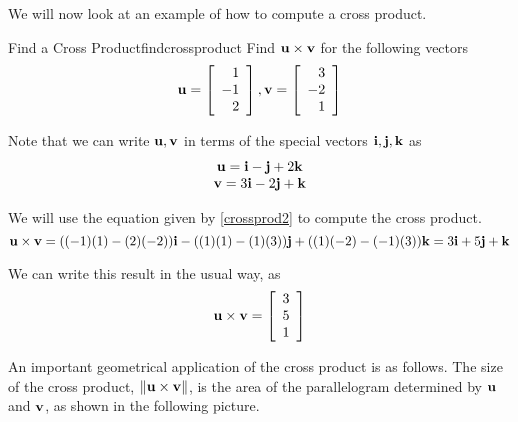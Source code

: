 We will now look at an example of how to compute a cross product.

\begin{example}{Find a Cross Product}{findcrossproduct}
Find ${\bf u} \times {\bf v}$ for the following vectors
\begin{equation*}
{\bf u}
=
\left[
\begin{array}{r}
1 \\
-1 \\
2
\end{array}
\right],
{\bf v}
=
\left[
\begin{array}{r}
3 \\
-2 \\
1
\end{array}
\right]
\end{equation*}
\end{example}

\begin{solution}
Note that we can write ${\bf u}, {\bf v}$ in terms of the special vectors ${\bf i},
{\bf j}, {\bf k}$ as 
\begin{equation*}
\begin{array}{c}
{\bf u}
=
{\bf i}-{\bf j}+2{\bf k} \\
{\bf v}
=
 3{\bf i}-2{\bf j}+{\bf k}
\end{array}
\end{equation*}

We will use the equation given by \ref{crossprod2} to compute the cross product. 
\begin{equation*}
{\bf u} \times {\bf v}
=((-1)(1)-(2)(-2)) {\bf i}- ((1)(1)-(1)(3)) {\bf j}+((1)(-2)-(-1)(3)) {\bf k}=3{\bf i}+5{\bf j}+{\bf k}
\end{equation*}

We can write this result in the usual way, as
\begin{equation*}
{\bf u} \times {\bf v}
=
\left[
\begin{array}{r}
3 \\
5 \\
1
\end{array}
\right]
\end{equation*}

\end{solution}

An important geometrical application of the cross product is as follows. The size of the cross product, $\| {\bf u}\times {\bf v}\| $, is the area of the
parallelogram determined by ${\bf u}$ and ${\bf v}$, as shown in the following picture. 

